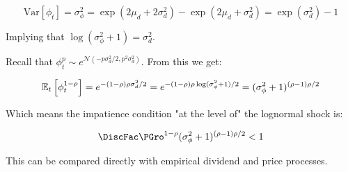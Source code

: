 \documentclass{\handout}
\begin{document}
\begin{equation}
  \text{Var}[\phi_t] = \sigma^2_\phi = \exp(2 \mu_d + 2 \sigma^2_d) - \exp(2 \mu_d + \sigma^2_d) = \exp(\sigma^2_d) - 1
\end{equation}

Implying that $\log ( \sigma^2_\phi + 1) = \sigma^2_d$.

Recall that $\phi^p_t \sim e^{\mathcal{N}(-p \sigma^2_d / 2, p^2 \sigma^2_d)}$. From this we get:

$$\mathbb{E}_t \left[ \phi^{1-\rho}_t  \right] = e^{-(1 - \rho)\rho\sigma^2_d/2} = e^{-(1 - \rho)\rho\log ( \sigma^2_\phi + 1)/2} = (\sigma^2_\phi + 1)^{(\rho - 1)\rho /2}$$

Which means the impatience condition "at the level of" the lognormal shock is:

$$ \DiscFac \PGro^{1-\CRRA} (\sigma^2_\phi + 1)^{(\CRRA - 1)\CRRA /2} < 1$$

This can be compared directly with empirical dividend and price processes.
\end{document}

